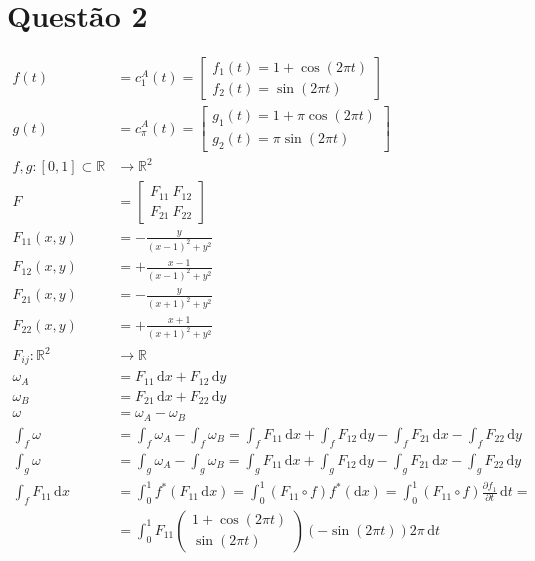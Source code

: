 \documentclass[12pt,a4paper]{article}
\begin{document}
	\section{Quest\~ao 2}
		\begin{align}
			f(t) &= c_1^A(t) = \begin{bmatrix} f_1(t) = 1 + \cos(2\pi t) \\ f_2(t) = \sin(2\pi t) \end{bmatrix} \\
			g(t) &= c_\pi^A(t) = \begin{bmatrix} g_1(t) = 1 + \pi \cos(2\pi t) \\ g_2(t) = \pi \sin(2\pi t) \end{bmatrix} \\
			f, g: [0,1] \subset \mathbb{R} &\rightarrow \mathbb{R}^2 \\
			F &= \begin{bmatrix} F_{11} \ F_{12} \\ F_{21} \ F_{22} \end{bmatrix} \\
			F_{11}(x,y) &= - \frac{y}{(x - 1)^2 + y^2} \\
			F_{12}(x,y) &= + \frac{x - 1}{(x - 1)^2 + y^2} \\
			F_{21}(x,y) &= - \frac{y}{(x + 1)^2 + y^2} \\
			F_{22}(x,y) &= + \frac{x+1}{(x + 1)^2 + y^2} \\
			F_{ij} : \mathbb{R}^2 &\rightarrow \mathbb{R} \\
			\omega_A &= F_{11} \,\mathrm{d}x + F_{12} \,\mathrm{d}y \\
			\omega_B &= F_{21} \,\mathrm{d}x + F_{22} \,\mathrm{d}y \\
			\omega &= \omega_A - \omega_B \\
			\int_f \omega &= \int_f \omega_A - \int_f \omega_B = \int_f F_{11} \,\mathrm{d}x + \int_f F_{12} \,\mathrm{d}y - \int_f F_{21} \,\mathrm{d}x - \int_f F_{22} \,\mathrm{d}y \label{Quinze} \\
			\int_g \omega &= \int_g \omega_A - \int_g \omega_B = \int_g F_{11} \,\mathrm{d}x + \int_g F_{12} \,\mathrm{d}y - \int_g F_{21} \,\mathrm{d}x - \int_g F_{22} \,\mathrm{d}y \label{Dezesseis} \\
			\int_f F_{11} \,\mathrm{d}x &= \int_0^1 f^*(F_{11} \,\mathrm{d}x) = \int_0^1 (F_{11} \circ f) f^*(\mathrm{d}x) = \int_0^1 (F_{11} \circ f) \frac{\partial f_1}{\partial t}\,\mathrm{d}t = \\
			&= \int_0^1 F_{11} \begin{pmatrix} 1 + \cos(2\pi t) \\ \sin(2\pi t) \end{pmatrix} (- \sin (2\pi t)) 2\pi \,\mathrm{d}t \\

\end{align}
\end{document}
